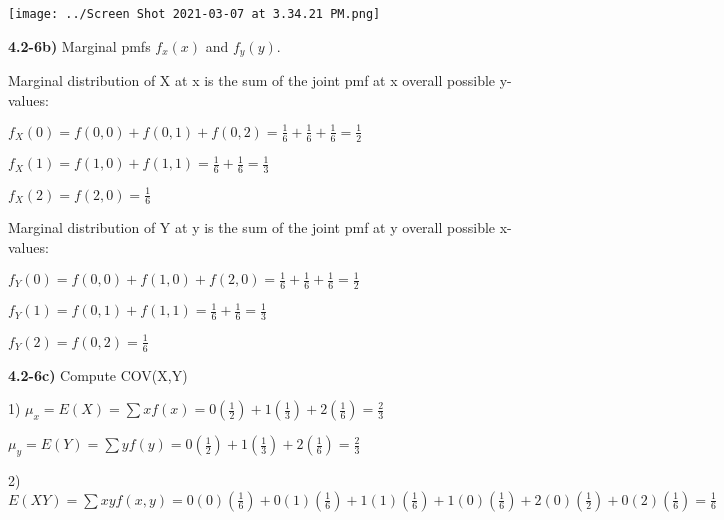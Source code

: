 \documentclass{article}
\begin{document}
\texttt{[image: ../Screen Shot 2021-03-07 at 3.34.21 PM.png]}



\vspace{4mm}

\textbf{ 4.2-6b)} Marginal pmfs $f_{x}(x)$ and $f_{y}(y)$. 

\vspace{2mm}

Marginal distribution of X at x is the sum of the joint pmf at x overall possible y-values:

\vspace{2mm}

$f_{X}(0)=f(0,0)+f(0,1)+f(0,2)=\frac{1}{6}+\frac{1}{6}+\frac{1}{6}=\frac{1}{2}$

\vspace{2mm}


$f_{X}(1)=f(1,0)+f(1,1)=\frac{1}{6}+\frac{1}{6}=\frac{1}{3}$

\vspace{2mm}


$f_{X}(2)=f(2,0)=\frac{1}{6}$



\vspace{5mm}

Marginal distribution of Y at y is the sum of the joint pmf at y overall possible x-values:


$f_{Y}(0)=f(0,0)+f(1,0)+f(2,0)=\frac{1}{6}+\frac{1}{6}+\frac{1}{6}=\frac{1}{2}$

\vspace{2mm}


$f_{Y}(1)=f(0,1)+f(1,1)=\frac{1}{6}+\frac{1}{6}=\frac{1}{3}$

\vspace{2mm}


$f_{Y}(2)=f(0,2)=\frac{1}{6}$


\vspace{5mm}


\textbf{ 4.2-6c)} Compute COV(X,Y)

\vspace{2mm}


1) $\mu_{x}=E(X)=\sum x f(x)=  0(\frac{1}{2})+1(\frac{1}{3})+2(\frac{1}{6})=\frac{2}{3}$


 $\mu_{y}=E(Y)=\sum y f(y)=  0(\frac{1}{2})+1(\frac{1}{3})+2(\frac{1}{6})=\frac{2}{3}$


\vspace{4mm}

2) $E(XY)= \sum xy f(x,y)=0(0)(\frac{1}{6})+0(1)(\frac{1}{6})+1(1)(\frac{1}{6})+1(0)(\frac{1}{6})+2(0)(\frac{1}{2})+0(2)(\frac{1}{6})=\frac{1}{6}$
\end{document}
